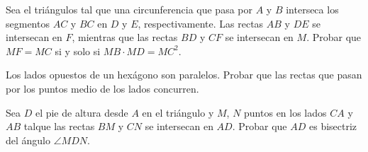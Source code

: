 \begin{section-problem}
    Sea el triángulos  tal que una circunferencia que pasa por $A$ y $B$ interseca los segmentos $AC$ y $BC$ en $D$ y $E$, respectivamente.
    Las rectas $AB$ y $DE$ se intersecan en $F$, mientras que las rectas $BD$ y $CF$ se intersecan en $M$.
    Probar que $MF = MC$ si y solo si $MB \cdot MD = MC^2$.
\end{section-problem}

\begin{section-problem}
    Los lados opuestos de un hexágono son paralelos.
    Probar que las rectas que pasan por los puntos medio de los lados concurren.
\end{section-problem}

\begin{section-problem}
    Sea $D$ el pie de altura desde $A$ en el triángulo  y $M$, $N$ puntos en los lados $CA$ y $AB$ talque las rectas $BM$ y $CN$ se intersecan en $AD$.
    Probar que $AD$ es bisectriz del ángulo $\angle MDN$.
\end{section-problem}